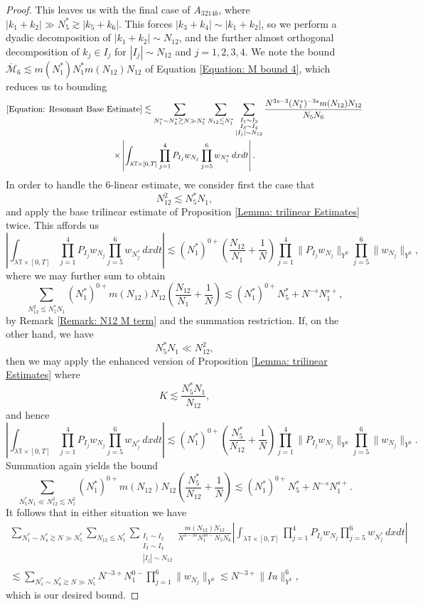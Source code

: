 \documentclass[12pt, letterpaper]{amsart}
\begin{document}
\begin{proof}
    This leaves us with the final case of $A_{3214b}$, where $|k_1+k_2|\gg N_5^*\gtrsim |k_5+k_6|$. This forces $|k_3+k_4|\sim |k_1+k_2|$, so we perform a dyadic decomposition of $|k_1+k_2|\sim N_{12}$, and the further almost orthogonal decomposition of $k_j\in I_j$ for $|I_j|\sim N_{12}$ and $j = 1,2,3,4$. We note the bound $\overline{\mathcal{M}}_6\lesssim m(N_1^*)N_1^*m(N_{12})N_{12}$ of Equation \eqref{Equation: M bound 4}, which reduces us to bounding
    \begin{multline*}
        \eqref{Equation: Resonant Base Estimate}\lesssim \sum_{N_1^*\sim N_4^*\gtrsim N\gg N_5^*}\sum_{N_{12}\lesssim N_1^*}\sum_{\substack{I_1\sim I_2\\I_3\sim I_4\\|I_j|\sim N_{12}}}\frac{N^{3s-3}(N_1^*)^{-3s}m(N_{12})N_{12}}{N_5N_6}\\
        \times\left|\int_{\lambda\mathbb{T}\times [0,T]}\prod_{j=1}^4P_{I_j}w_{N_j}\prod_{j=5}^6w_{N_j^*}\,dxdt\right|.
    \end{multline*}
    In order to handle the $6$-linear estimate, we consider first the case that
    \[
    N_{12}^2\lesssim N_5^*N_1,
    \]
     and apply the base trilinear estimate of Proposition \ref{Lemma: trilinear Estimates} twice. This affords us
    \[
    \left|\int_{\lambda\mathbb{T}\times [0,T]}\prod_{j=1}^4P_{I_j}w_{N_j}\prod_{j=5}^6w_{N_j^*}\,dxdt\right|\lesssim (N_1^*)^{0+}\left(\frac{N_{12}}{N_1}+\frac{1}{N}\right)\prod_{j=1}^4\|P_{I_j}w_{N_j}\|_{Y^0}\prod_{j=5}^6\|w_{N_j}\|_{Y^0},
    \]
    where we may further sum to obtain
    \[
    \sum_{N_{12}^2\lesssim N_5^*N_1}(N_1^*)^{0+}m(N_{12})N_{12}\left(\frac{N_{12}}{N_1}+\frac{1}{N}\right)\lesssim (N_1^*)^{0+}N_5^* + N^{-s}N_1^{s+},
    \]
    by Remark \ref{Remark: N12 M term} and the summation restriction. If, on the other hand, we have
    \[
    N_5^*N_1\ll N_{12}^2,
    \]
    then we may apply the enhanced version of Proposition \ref{Lemma: trilinear Estimates} where
    \[
    K\lesssim \frac{N_5^*N_1}{N_{12}},
    \]
    and hence
    \[
    \left|\int_{\lambda\mathbb{T}\times [0,T]}\prod_{j=1}^4P_{I_j}w_{N_j}\prod_{j=5}^6w_{N_j^*}\,dxdt\right|\lesssim (N_1^*)^{0+}\left(\frac{N_5^*}{N_{12}}+\frac{1}{N}\right)\prod_{j=1}^4\|P_{I_j}w_{N_j}\|_{Y^0}\prod_{j=5}^6\|w_{N_j}\|_{Y^0}.
    \]
    Summation again yields the bound
    \[
    \sum_{N_5^*N_1\ll N_{12}^2\lesssim N_1^2}(N_1^*)^{0+}m(N_{12})N_{12}\left(\frac{N_{5}^*}{N_{12}}+\frac{1}{N}\right)\lesssim (N_1^*)^{0+}N_5^* + N^{-s}N_1^{s+}.
    \]
    It follows that in either situation we have
    \begin{multline*}
        \sum_{N_1^*\sim N_4^*\gtrsim N\gg N_5^*}\sum_{N_{12}\lesssim N_1^*}\sum_{\substack{I_1\sim I_2\\I_3\sim I_4\\|I_j|\sim N_{12}}}\frac{m(N_{12})N_{12}}{N^{3-3s}N_1^{3s-}N_5N_6}
        \left|\int_{\lambda\mathbb{T}\times [0,T]}\prod_{j=1}^4P_{I_j}w_{N_j}\prod_{j=5}^6w_{N_j^*}\,dxdt\right|\\
        \lesssim \sum_{N_1^*\sim N_4^*\gtrsim N\gg N_5^*}N^{-3+}N_1^{0-}\prod_{j=1}^6 \|w_{N_j}\|_{Y^0}\lesssim N^{-3+}\|Iu\|_{Y^1}^6,
    \end{multline*}
    which is our desired bound.


\end{proof}
\end{document}

